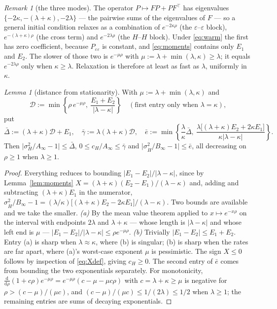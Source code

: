 \documentclass[11pt,a4paper]{article}
\theoremstyle{remark}\newtheorem{remark}[proposition]{Remark}
\newtheorem{lemma}{Lemma}[section]
\newcommand{\dd}{\mathrm{d}}
\newcommand{\Ain}{A_{\infty}}
\newcommand{\Bin}{B_{\infty}}
\begin{document}
\begin{remark}[the three modes]\label{rem:modes}
The operator $P\mapsto FP+PF^{\!\top}$ has eigenvalues $\{-2\kappa,-(\lambda+\kappa),-2\lambda\}$
--- the pairwise sums of the eigenvalues of $F$ --- so a general initial condition
relaxes as a combination of $e^{-2\kappa\rho}$ (the $\varepsilon$--$\varepsilon$
block), $e^{-(\lambda+\kappa)\rho}$ (the cross term) and $e^{-2\lambda\rho}$ (the
$H$--$H$ block). Under \eqref{eq:warm} the first has zero coefficient, because
$P_{\varepsilon\varepsilon}$ is constant, and \eqref{eq:moments} contains only $E_1$
and $E_2$. The slower of those two is $e^{-\mu\rho}$ with
$\mu:=\lambda+\min(\lambda,\kappa)\ge\lambda$; it equals $e^{-2\lambda\rho}$ only when
$\kappa\ge\lambda$. Relaxation is therefore at least as fast as $\lambda$, uniformly
in $\kappa$.
\end{remark}

\begin{lemma}[distance from stationarity]\label{lem:bounds}
With $\mu:=\lambda+\min(\lambda,\kappa)$ and
\begin{equation}
\mathcal{D}:=\min\left\{\rho\,e^{-\mu\rho},\ \frac{E_1+E_2}{|\lambda-\kappa|}\right\}
\quad(\text{first entry only when }\lambda=\kappa),
\label{eq:Dcal}
\end{equation}
put
\begin{equation}
\bar\Delta:=(\lambda+\kappa)\mathcal{D}+E_1,\quad
\bar\gamma:=\lambda(\lambda+\kappa)\mathcal{D},\quad
\bar e:=\min\left\{\frac{\lambda}{\kappa}\bar\Delta,\
\frac{\lambda\bigl[(\lambda+\kappa)E_2+2\kappa E_1\bigr]}{\kappa|\lambda-\kappa|}\right\}.
\label{eq:Dbar}
\end{equation}
Then
$\bigl|\sigma_H^{2}/\Ain-1\bigr|\le\bar\Delta$,
$0\le c_H/\Ain\le\bar\gamma$ and
$\bigl|\sigma_{\dot H}^{2}/\Bin-1\bigr|\le\bar e$, all decreasing on $\rho\ge1$ when
$\lambda\ge1$.
\end{lemma}
\begin{proof}
Everything reduces to bounding $|E_1-E_2|/|\lambda-\kappa|$, since by
Lemma~\ref{lem:moments} $X=(\lambda+\kappa)(E_2-E_1)/(\lambda-\kappa)$ and, adding and
subtracting $(\lambda+\kappa)E_1$ in the numerator,
$\sigma_{\dot H}^{2}/\Bin-1=(\lambda/\kappa)\bigl[(\lambda+\kappa)E_2-2\kappa E_1\bigr]/(\lambda-\kappa)$.
Two bounds are available and we take the smaller. \emph{(a)} By the mean value theorem
applied to $x\mapsto e^{-x\rho}$ on the interval with endpoints $2\lambda$ and
$\lambda+\kappa$ --- whose length is $|\lambda-\kappa|$ and whose left end is $\mu$ ---
$|E_1-E_2|/|\lambda-\kappa|\le\rho e^{-\mu\rho}$. \emph{(b)} Trivially
$|E_1-E_2|\le E_1+E_2$. Entry (a) is sharp when $\lambda\approx\kappa$, where (b) is
singular; (b) is sharp when the rates are far apart, where (a)'s worst-case exponent
$\mu$ is pessimistic. The sign $X\le0$ follows by inspection of \eqref{eq:Xdef}, giving
$c_H\ge0$. The second entry of $\bar e$ comes from bounding the two exponentials
separately. For monotonicity,
$\frac{\dd}{\dd\rho}(1+c\rho)e^{-\mu\rho}=e^{-\mu\rho}(c-\mu-\mu c\rho)$ with
$c=\lambda+\kappa\ge\mu$ is negative for $\rho>(c-\mu)/(\mu c)$, and
$(c-\mu)/(\mu c)\le1/(2\lambda)\le1/2$ when $\lambda\ge1$; the remaining entries are
sums of decaying exponentials.
\end{proof}
\end{document}
